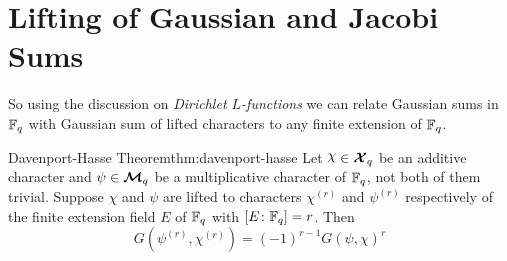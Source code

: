 \section{Lifting of Gaussian and Jacobi Sums}\label{sec:lifting-gauss-jacobi}
So using the discussion on \emph{Dirichlet $L$-functions} we can relate Gaussian sums in $\mathbb{F}_q$ with Gaussian sum of lifted characters to any finite extension of $\mathbb{F}_q$. 
\begin{Theorem}{Davenport-Hasse Theorem}{thm:davenport-hasse}
  Let $\chi\in\Xq$ be an additive character and $\psi\in\boldsymbol{\mathcal{M}}_q$ be a multiplicative character of $\mathbb{F}_q$, not both of them trivial. Suppose $\chi$ and $\psi$ are lifted to characters $\chi^{(r)}$ and $\psi^{(r)}$ respectively of the finite extension field $E$ of $\mathbb{F}_q$ with $[E\colon \mathbb{F}_q]=r$. Then $$G(\psi^{(r)},\chi^{(r)})=(-1)^{r-1}G(\psi,\chi)^r$$
\end{Theorem}
